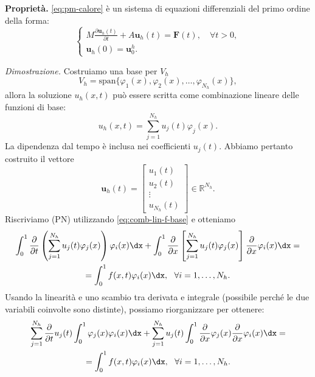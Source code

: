 \textbf{Proprietà.}
\eqref{eq:pm-calore} è un sistema di equazioni differenziali del primo ordine della forma:
\begin{equation}
\begin{cases}
M\frac{\partial \mathbf{u}_{h}(t)}{\partial t} +A\mathbf{u}_{h}(t) =\mathbf{F}(t) ,\quad \forall t >0,\\
\mathbf{u}_{h}(0) =\mathbf{u}^{h}_{0} .
\end{cases}
\label{eq:sist-edp-pn}
\end{equation}


\textit{Dimostrazione.} Costruiamo una base per $V_{h}$
\begin{equation*}
V_{h} =\mathrm{span}\{\varphi _{1}(x) ,\varphi _{2}(x) ,\dotsc ,\varphi _{N_{h}}(x)\} ,
\end{equation*}
allora la soluzione $u_{h}( x,t)$ può essere scritta come combinazione lineare delle funzioni di base:
\begin{equation}
u_{h}( x,t) =\sum\limits ^{N_{h}}_{j=1} u_{j}(t) \varphi _{j}(x).
\label{eq:comb-lin-f-base}
\end{equation}
La dipendenza dal tempo è inclusa nei coefficienti $u_{j}(t)$.
Abbiamo pertanto costruito il vettore
\begin{equation*}
\mathbf{u}_{h}(t) =\begin{bmatrix}
u_{1}(t)\\
u_{2}(t)\\
\vdots \\
u_{N_{h}}(t)
\end{bmatrix} \in \mathbb{R}^{N_{h}} .
\end{equation*}
Riscriviamo (PN) utilizzando \eqref{eq:comb-lin-f-base} e otteniamo
\begin{gather*}
\int\nolimits ^{1}_{0}\frac{\partial }{\partial t}\left(\sum\limits ^{N_{h}}_{j=1} u_{j}(t) \varphi _{j}(x)\right) \varphi _{i}(x) \dx+\int\nolimits ^{1}_{0}\frac{\partial }{\partial x}\left[\sum\limits ^{N_{h}}_{j=1} u_{j}(t) \varphi _{j}(x)\right]\frac{\partial }{\partial x} \varphi _{i}(x) \dx=\\
=\int\nolimits ^{1}_{0} f( x,t) \varphi _{i}(x) \dx,\ \ \forall i=1,\dotsc ,N_{h}.
\end{gather*}
Usando la linearità e uno scambio tra derivata e integrale (possibile perché le due variabili coinvolte sono distinte), possiamo riorganizzare per ottenere:
\begin{gather*}
\sum\limits ^{N_{h}}_{j=1}\frac{\partial }{\partial t} u_{j}(t)\int\nolimits ^{1}_{0} \varphi _{j}(x) \varphi _{i}(x) \dx+\sum\limits ^{N_{h}}_{j=1} u_{j}(t)\int\nolimits ^{1}_{0}\frac{\partial }{\partial x} \varphi _{j}(x)\frac{\partial }{\partial x} \varphi _{i}(x) \dx=\\
=\int\nolimits ^{1}_{0} f( x,t) \varphi _{i}(x) \dx,\ \ \forall i=1,\dotsc ,N_{h} .
\end{gather*}
